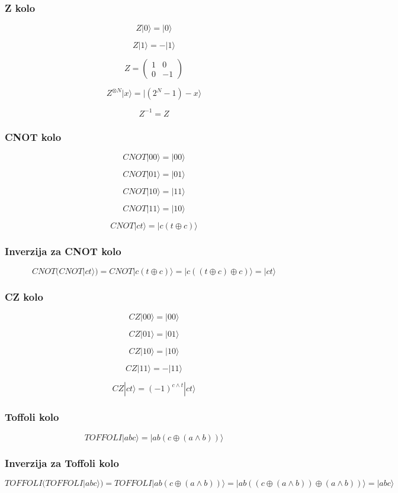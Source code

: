 \documentclass[aspectratio=169]{beamer}
\begin{document}
\begin{frame}
    \frametitle{Z kolo}
$$ Z|0\rangle = |0\rangle $$

$$ Z|1\rangle = -|1\rangle $$

$$ Z = \begin{pmatrix}
1 & 0 \\
0 & -1
\end{pmatrix} $$

$$ Z^{\otimes N} |x\rangle = |(2^N - 1) - x\rangle $$

$$ Z^{-1} = Z $$
\end{frame}

\begin{frame}
    \frametitle{CNOT kolo}

    $$ CNOT|00\rangle = |00\rangle $$

$$ CNOT|01\rangle = |01\rangle $$

$$ CNOT|10\rangle = |11\rangle $$

$$ CNOT|11\rangle = |10\rangle $$

$$ CNOT|c t\rangle = |c (t \oplus c)\rangle $$
    

\end{frame}


\begin{frame}
    \frametitle{Inverzija za CNOT kolo}

$$ CNOT(CNOT|c t\rangle) = CNOT|c (t \oplus c)\rangle = |c ((t \oplus c) \oplus c)\rangle = |c t\rangle $$    

\end{frame}


\begin{frame}
    \frametitle{CZ kolo}

    $$ CZ|00\rangle = |00\rangle $$

    $$ CZ|01\rangle = |01\rangle $$

    $$ CZ|10\rangle = |10\rangle $$

    $$ CZ|11\rangle = -|11\rangle $$

    $$ CZ|c t\rangle = (-1)^{c \land t} |c t\rangle $$

\end{frame}

\begin{frame}
    \frametitle{Toffoli kolo}

    $$ TOFFOLI|abc\rangle = |ab(c \oplus (a \land b))\rangle $$

\end{frame}


\begin{frame}
    \frametitle{Inverzija za Toffoli kolo}

    $$ TOFFOLI(TOFFOLI|abc\rangle) = TOFFOLI|ab(c \oplus (a \land b))\rangle = |ab((c \oplus (a \land b)) \oplus (a \land b))\rangle = |abc\rangle $$

\end{frame}
\end{document}
